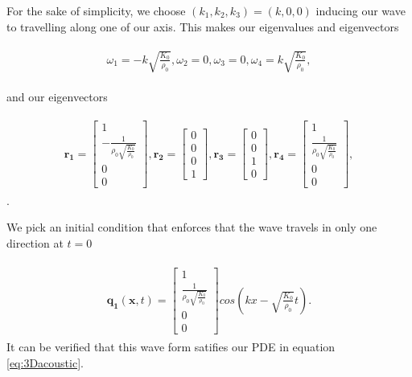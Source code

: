 For the sake of simplicity, we choose $\left(k_1,k_2,k_3\right) = \left(k,0,0\right)$ inducing our wave to travelling along one of our axis. This makes our eigenvalues and eigenvectors

\begin{align}
    \begin{split}
        \omega_1 = -k \sqrt{\frac{K_{0}}{\rho_{0}}},
        \omega_2 = 0,
        \omega_3 = 0,
        \omega_4 = k \sqrt{\frac{K_{0}}{\rho_{0}}},
    \end{split}
\end{align}

and our eigenvectors

\begin{align}
    \begin{split}
    \mathbf{r_1} = \begin{bmatrix}
        1 \\
-\frac{1}{\rho_{0} \sqrt{\frac{K_{0}}{\rho_{0}}}} \\
0 \\
0
        \end{bmatrix},
        \mathbf{r_2} = \begin{bmatrix}
            0 \\
0 \\
0 \\
1
            \end{bmatrix},
            \mathbf{r_3} = \begin{bmatrix}
                0 \\
                0 \\
                1 \\
                0
                \end{bmatrix},
                \mathbf{r_4} = \begin{bmatrix}
                    1 \\
                    \frac{1}{\rho_{0} \sqrt{\frac{K_{0}}{\rho_{0}}}} \\
                    0 \\
                    0                    
                \end{bmatrix},
    \end{split}
\end{align} .

We pick an initial condition that enforces that the wave travels in only one direction at $t=0$

\begin{align}
    \begin{split}
        \mathbf{q_1}\left(\mathbf{x}, t\right) = \begin{bmatrix}
            1 \\
            \frac{1}{\rho_{0} \sqrt{\frac{K_{0}}{\rho_{0}}}} \\
            0 \\
            0
            \end{bmatrix} cos\left(kx - \sqrt{\frac{K_{0}}{\rho_{0}}}t\right) .
    \end{split}
\end{align}
It can be verified that this wave form satifies our PDE in equation \ref{eq:3Dacoustic}.

